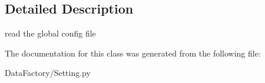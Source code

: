 \subsection{Detailed Description}
\begin{DoxyVerb}read the global config file\end{DoxyVerb}
 

The documentation for this class was generated from the following file\+:\begin{DoxyCompactItemize}
\item 
Data\+Factory/Setting.\+py\end{DoxyCompactItemize}
